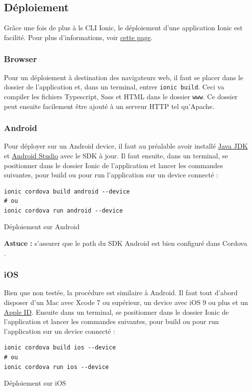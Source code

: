 \documentclass[a4paper, 12pt]{article}
\newenvironment{code}{\captionsetup{type=listing}}{}
\begin{document}
\subsection{Déploiement}
Grâce une fois de plus à ls CLI Ionic, le déploiement d'une application Ionic est facilité. Pour plus d'informations, voir 
\href{https://ionicframework.com/docs/intro/deploying/}{cette page}.
\subsubsection{Browser}
Pour un déploiement à destination des navigateurs web, il faut se placer dans le dossier de l'application et, dans 
un terminal, entrer \texttt{ionic build}. Ceci va compiler les fichiers Typescript, Sass et HTML dans le 
dossier \texttt{www}. Ce dossier peut ensuite facilement être ajouté à un serveur HTTP tel qu'Apache.

\subsubsection{Android}
Pour déployer sur un Android device, il faut au préalable avoir installé 
\href{http://www.oracle.com/technetwork/java/javase/downloads/index-jsp-138363.html}{Java JDK} et 
\href{https://developer.android.com/studio/index.html}{Android Studio} avec le SDK à jour. Il faut ensuite, dans un 
terminal, se positionner dans le dossier Ionic de l'application et lancer les commandes suivantes, pour build ou pour 
run l'application sur un device connecté : 
\begin{code}
    \begin{verbatim}
ionic cordova build android --device
# ou
ionic cordova run android --device
    \end{verbatim}
    \caption{Déploiement sur Android}
\end{code}
\textbf{Astuce : } s'assurer que le path du SDK Android est bien configuré dans Cordova \cite{ref60}.

\subsubsection{iOS}
Bien que non testée, la procédure est similaire à Android. Il faut tout d'abord disposer d'un Mac avec Xcode 7 ou 
supérieur, un device avec iOS 9 ou plus et un \href{https://appleid.apple.com/}{Apple ID}. Ensuite dans un 
terminal, se positionner dans le dossier Ionic de l'application et lancer les commandes suivantes, pour build ou pour 
run l'application sur un device connecté : 
\begin{code}
    \begin{verbatim}
ionic cordova build ios --device
# ou
ionic cordova run ios --device
    \end{verbatim}
    \caption{Déploiement sur iOS}
\end{code}
\end{document}
